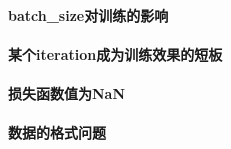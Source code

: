 \paragraph{batch\_size对训练的影响}

\paragraph{某个iteration成为训练效果的短板}

\paragraph{损失函数值为NaN}

\paragraph{}

\paragraph{数据的格式问题}
